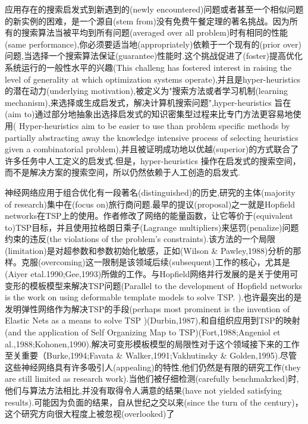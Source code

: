 \documentclass[a4paper,UTF8]{ctexart}
\theoremstyle{definition}
\begin{document}
应用存在的搜索启发式到新遇到的(newly encountered)问题或者甚至一个相似问题的新实例的困难，是一个源自(stem from)没有免费午餐定理的著名挑战。因为所有的搜索算法当被平均到所有问题(averaged over all problem)时有相同的性能(same performance),你必须要适当地(appropriately)依赖于一个现有的(prior over)问题,当选择一个搜索算法保证(guarantee)性能时.这个挑战促进了(foster)提高优化系统运行的一般性水平的兴趣(This challeng has fostered interest in raising the level of generality at which optimization systems operate),并且是hyper-heuristics的潜在动力(underlying motivation),被定义为"搜索方法或者学习机制(learning mechanism),来选择或生成启发式，解决计算机搜索问题",hyper-heuristics 旨在(aim to)通过部分地抽象出选择启发式的知识密集型过程来比专门方法更容易地使用( Hyper-heuristics aim to be easier to use than problem specific methods by partially abstracting away the knowledge intensive process of selecting heuristics given a combinatorial problem),并且被证明成功地以优越(superior)的方式联合了许多任务中人工定义的启发式.但是，hyper-heuristics 操作在启发式的搜索空间，而不是解决方案的搜索空间，所以仍然依赖于人工创造的启发式.

神经网络应用于组合优化有一段著名(distinguished)的历史,研究的主体(majority of research)集中在(focus on)旅行商问题.最早的提议(proposal)之一就是Hopfield networks在TSP上的使用。作者修改了网络的能量函数，让它等价于(equivalent to)TSP目标，并且使用拉格朗日乘子(Lagrange multipliers)来惩罚(penalize)问题约束的违反(the violations of the problem's constraints).该方法的一个局限(limitation)是对超参数和参数初始化敏感，正如(Wilson \& Pawley,1988)分析的那样。克服(overcoming)这一限制是该领域后续(subsequent)工作的核心，尤其是(Aiyer etal.1990;Gee,1993)所做的工作。与Hopfield网络并行发展的是关于使用可变形的模板模型来解决TSP问题(Parallel to the development of Hopfield networks is the work on using deformable template models to solve TSP. ).也许最突出的是发明弹性网络作为解决TSP的手段(perhaps most prominent is the invention of Elastic Nets as a means to solve TSP )(Durbin,1987),和自组织应用到TSP的映射(and the application of Self Organizing Map to TSP)(Fort,1988;Angeniol et al.,1988;Kohonen,1990).解决可变形模板模型的局限性对于这个领域接下来的工作至关重要（Burke,1994;Favata \& Walker,1991;Vakhutinsky \& Golden,1995).尽管这些神经网络具有许多吸引人(appealing)的特性,他们仍然是有限的研究工作(they are still limited as research work).当他们被仔细检测(carefully benchmakrked)时,他们与算法方法相比,并没有取得令人满意的结果(have not yielded satisfying results).可能因为负面的结果，自从世纪之交以来(since the turn of the century)，这个研究方向很大程度上被忽视(overlooked)了
\end{document}
